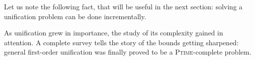 Let us note the following fact, that will be useful in the next section: solving a unification problem can be done incrementally.

\smallskip
{}








As unification grew in importance, the study of its complexity gained in attention.
A complete survey \cite{knight_unification_1989} tells the story of the bounds getting sharpened: general first-order unification was finally proved \cite{dwork_sequential_1984} to be a \textsc{Ptime}-complete problem.

